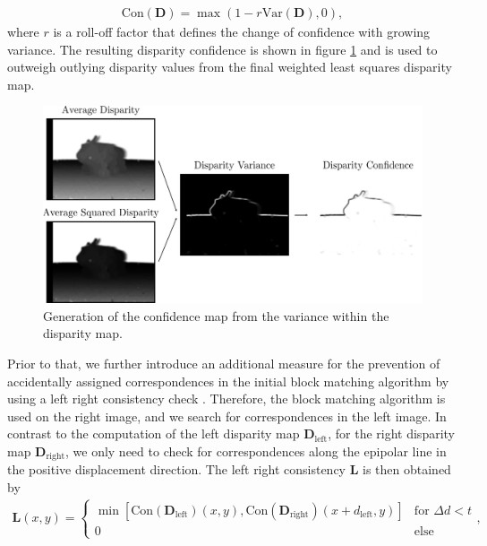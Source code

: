 \begin{align}
	\text{Con}(\bm{D}) = \max\left(1-r\text{Var}(\bm{D}),0\right),
\end{align}
where $r$ is a roll-off factor that defines the change of confidence with growing variance. The resulting disparity confidence is shown in figure \ref{fig::224_confidence_map} and is used to outweigh outlying disparity values from the final weighted least squares disparity map. 
\begin{figure}[h!]
	\centering
	\includegraphics[scale=.28]{chapters/02_background/img/confidence_map.png}
	\caption{Generation of the confidence map from the variance within the disparity map.}
	\label{fig::224_confidence_map}
\end{figure}
Prior to that, we further introduce an additional measure for the prevention of accidentally assigned correspondences in the initial block matching algorithm by using a left right consistency check \cite{egnal2004stereo}. Therefore, the block matching algorithm is used on the right image, and we search for correspondences in the left image. In contrast to the computation of the left disparity map $\bm{D}_\text{left}$, for the right disparity map $\bm{D}_\text{right}$, we only need to check for correspondences along the epipolar line in the positive displacement direction. The left right consistency $\bm{L}$ is then obtained by 
\begin{align}
	\bm{L}(x, y) = 
	\begin{cases}
	\min \left[\text{Con}(\bm{D}_\text{left})(x, y), \text{Con}(\bm{D}_\text{right})(x + d_\text{left}, y)\right] & \text{for } \Delta d < t  \\
	0 & \text{else}
	\end{cases},
\end{align}
